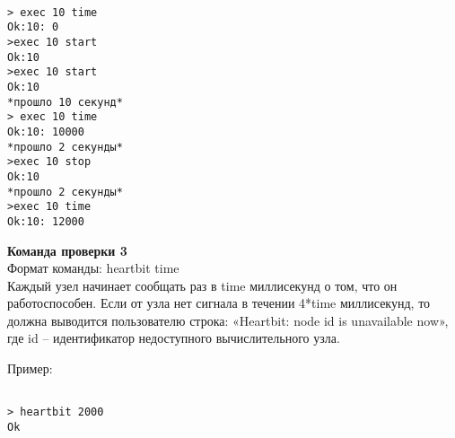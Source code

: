 \begin{verbatim}

> exec 10 time
Ok:10: 0
>exec 10 start
Ok:10
>exec 10 start
Ok:10
*прошло 10 секунд*
> exec 10 time
Ok:10: 10000
*прошло 2 секунды*
>exec 10 stop
Ok:10
*прошло 2 секунды*
>exec 10 time
Ok:10: 12000

\end{verbatim}



\textbf{Команда проверки 3}\\
Формат команды: heartbit time\\
Каждый узел начинает сообщать раз в time миллисекунд о том, что он работоспособен. Если от узла нет сигнала в течении 4*time миллисекунд, то должна выводится пользователю строка: «Heartbit: node id is unavailable now», где id – идентификатор недоступного вычислительного узла.

Пример:

\begin{verbatim}
    
> heartbit 2000
Ok

\end{verbatim}

\pagebreak

